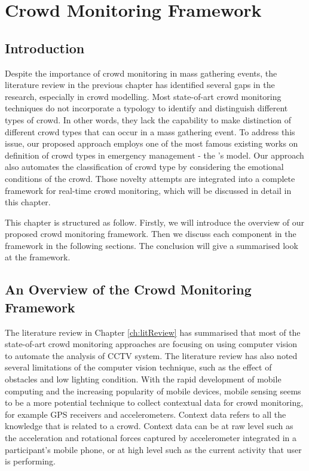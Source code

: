 \chapter{Crowd Monitoring Framework}
\label{ch:approach}
\ifpdf
\graphicspath{{Chapter3/Figs/Raster/}{Chapter3/Figs/PDF/}{Chapter3/Figs/}}
\else
\graphicspath{{Chapter3/Figs/Vector/}{Chapter3/Figs/}}
\fi

\section{Introduction}
\label{sec:approachIntro}
Despite the importance of crowd monitoring in mass gathering events, the literature review in the previous chapter has identified several gaps in the research, especially in crowd modelling. Most state-of-art crowd monitoring techniques do not incorporate a typology to identify and distinguish different types of crowd. In other words, they lack the capability to make distinction of different crowd types that can occur in a mass gathering event. To address this issue, our proposed approach employs one of the most famous existing works on definition of crowd types in emergency management - the \citet{Berlonghi1995}'s model. Our approach also automates the classification of crowd type by considering the emotional conditions of the crowd. Those novelty attempts are integrated into a complete framework for real-time crowd monitoring, which will be discussed in detail in this chapter.

This chapter is structured as follow. Firstly, we will introduce the overview of our proposed crowd monitoring framework. Then we discuss each component in the framework in the following sections. The conclusion will give a summarised look at the framework.

\section{An Overview of the Crowd Monitoring Framework}

The literature review in Chapter \ref{ch:litReview} has summarised that most of the state-of-art crowd monitoring approaches are focusing on using computer vision to automate the analysis of CCTV system. The literature review has also noted several limitations of the computer vision technique, such as the effect of obstacles and low lighting condition. With the rapid development of mobile computing and the increasing popularity of mobile devices, mobile sensing seems to be a more potential technique to collect contextual data for crowd monitoring, for example GPS receivers and accelerometers. Context data refers to all the knowledge that is related to a crowd. Context data can be at raw level such as the acceleration and rotational forces captured by accelerometer integrated in a participant's mobile phone, or at high level such as the current activity that user is performing.

